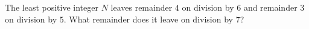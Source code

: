 The least positive integer $N$ leaves remainder $4$ on division by $6$ and remainder $3$ on division by $5$. What remainder does it leave on division by $7$?

